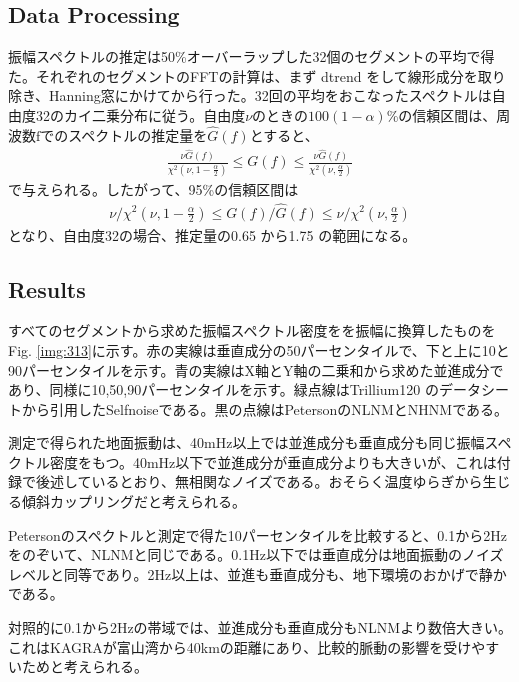\subsection{Data Processing}
振幅スペクトルの推定は50\%オーバーラップした32個のセグメントの平均で得た。それぞれのセグメントのFFTの計算は、まず dtrend をして線形成分を取り除き、Hanning窓にかけてから行った。32回の平均をおこなったスペクトルは自由度32のカイ二乗分布に従う。自由度$\nu$のときの$100(1-\alpha)$\%の信頼区間は、周波数$\mathrm{f}$でのスペクトルの推定量を$\hat{G}(f)$とすると、
\begin{eqnarray}
  \frac{\nu{\hat{G}(f)}}{\chi^2(\nu,1-\frac{\alpha}{2})} \leq G(f) \leq \frac{\nu{\hat{G}(f)}}{\chi^2(\nu,\frac{\alpha}{2})}
\end{eqnarray}
で与えられる。したがって、95\%の信頼区間は
\begin{eqnarray}
  \nu/\chi^2(\nu,1-\frac{\alpha}{2}) \leq G(f)/\hat{G}(f) \leq \nu/\chi^2(\nu,\frac{\alpha}{2})
\end{eqnarray}
となり、自由度32の場合、推定量の0.65 から1.75 の範囲になる。

\subsection{Results}
すべてのセグメントから求めた振幅スペクトル密度をを振幅に換算したものをFig. \ref{img:313}に示す。赤の実線は垂直成分の50パーセンタイルで、下と上に10と90パーセンタイルを示す。青の実線はX軸とY軸の二乗和から求めた並進成分であり、同様に10,50,90パーセンタイルを示す。緑点線はTrillium120 のデータシートから引用したSelfnoiseである。黒の点線はPetersonのNLNMとNHNMである。


測定で得られた地面振動は、40mHz以上では並進成分も垂直成分も同じ振幅スペクトル密度をもつ。40mHz以下で並進成分が垂直成分よりも大きいが、これは付録で後述しているとおり、無相関なノイズである。おそらく温度ゆらぎから生じる傾斜カップリングだと考えられる。

Petersonのスペクトルと測定で得た10パーセンタイルを比較すると、0.1から2Hzをのぞいて、NLNMと同じである。0.1Hz以下では垂直成分は地面振動のノイズレベルと同等であり。2Hz以上は、並進も垂直成分も、地下環境のおかげで静かである。

対照的に0.1から2Hzの帯域では、並進成分も垂直成分もNLNMより数倍大きい。これはKAGRAが富山湾から40kmの距離にあり、比較的脈動の影響を受けやすいためと考えられる。

